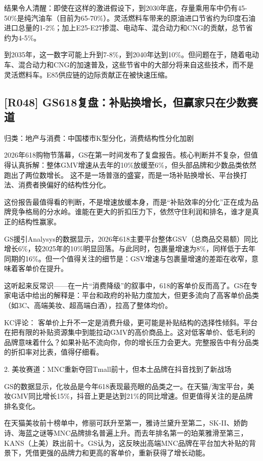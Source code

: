 \documentclass[11pt]{ctexart}
\begin{document}
结果令人清醒：即使在这样的激进假设下，到2030年底，存量乘用车中仍有45-50\%是纯汽油车（目前为65-70\%）。灵活燃料车带来的原油进口节省约为印度石油进口总量的1-2\%；加上E25-E27掺混、电动车、混合动力和CNG的贡献，总节省约为4-5\%。

到2035年，这一数字可能上升到7-8\%，到2040年达到10\%。但问题在于，随着电动车、混合动力和CNG的加速普及，这些节省中的大部分将来自这些技术，而不是灵活燃料车。E85供应链的边际贡献正在被快速压缩。

\subsection{[R048] GS618复盘：补贴换增长，但赢家只在少数赛道}
{\small\color{refgray}归类：地产与消费：中国楼市K型分化，消费结构性分化加剧}

2026年618购物节落幕，GS在第一时间发布了复盘报告。核心判断并不复杂，但值得认真拆解：整体GMV增速从去年的10\%放缓至6\%，但头部品牌和少数品类依然跑出了两位数增长。 这不是一场普涨的盛宴，而是一场补贴换增长、平台换打法、消费者换偏好的结构性分化。

这份报告最值得看的判断，不是增速放缓本身，而是“补贴效率的分化”正在成为品牌竞争格局的分水岭。谁能在更大的折扣压力下，依然守住利润和排名，谁才是真正的结构性赢家。

GS援引Analysys的数据显示，2026年618主要平台整体GSV（总商品交易额）同比增长6\%，较2025年的10\%明显回落。与此同时，包裹量增速为8\%，同样低于去年同期的16\%。但一个值得关注的细节是：GSV增速与包裹量增速的差距在收窄，意味着客单价在提升。

这听起来反常识——在一片“消费降级”的叙事中，618的客单价反而高了。GS在专家电话中给出的解释是：平台和政府的补贴力度加大，但更多流向了高客单价品类（如3C、高端美妆、超高端白酒），拉高了整体均价。

KC评论： 客单价上升不一定是消费升级，更可能是补贴结构的选择性倾斜。平台在把有限的补贴资源集中到能拉动GMV的高价商品上。这对低客单价、低毛利的品牌意味着什么？如果补贴不流向你，你的增长压力会更大。完整报告中有分品类的折扣率对比表，值得仔细看。

2. 美妆赛道：MNC重新夺回Tmall前十，但本土品牌在抖音找到了新战场

GS的数据显示，化妆品是今年618表现最亮眼的品类之一。在天猫/淘宝平台，美妆GMV同比增长15\%，抖音上更是达到21\%的同比增速。但更值得关注的是品牌排名变化。

在天猫美妆前十榜单中，修丽可跃升至第一，雅诗兰黛升至第二，SK-II、娇韵诗、海蓝之谜等MNC品牌排名普遍上升。而去年排名第一的珀莱雅滑至第三，KANS（上美）跌出前十。GS认为，这反映出高端MNC品牌在平台加大补贴的背景下，凭借更强的品牌力和更高的客单价，重新获得了增长动能。
\end{document}
